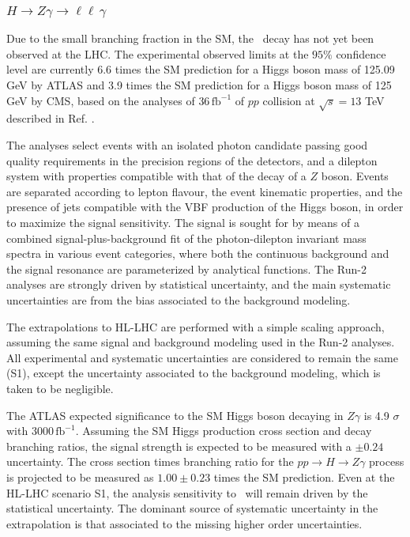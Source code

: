 \subsubsection{$H \to Z\gamma \to \ell\ell\,\gamma$}

Due to the small branching fraction in the SM, the \HZy\ decay has not yet been observed at the LHC. The experimental observed limits at the $95\%$ confidence level are currently 6.6 times the SM prediction for a Higgs boson mass of 125.09 GeV by ATLAS and 3.9 times the SM prediction for a Higgs boson mass of 125 GeV by CMS, based on the analyses of 36\,$\mathrm{fb}^{-1}$ of $pp$ collision at $\sqrt{s} = 13$ TeV described in Ref. \cite{Aaboud:2017uhw, Sirunyan:2018tbk}.

The analyses select events with an isolated photon candidate passing good quality requirements in the precision regions of the detectors, and a dilepton system with properties compatible with that of the decay of a $Z$ boson. Events are separated according to lepton flavour, the event kinematic properties, and the presence of jets compatible with the VBF production of the Higgs boson, in order to maximize the signal sensitivity. The signal is sought for by means of a combined signal-plus-background fit of the photon-dilepton invariant mass spectra in various event categories, where both the continuous background and the signal resonance are parameterized by analytical functions. The Run-2 analyses are strongly driven by statistical uncertainty, and the main systematic uncertainties are from the bias associated to the background modeling.

The extrapolations to HL-LHC are performed with a simple scaling approach, assuming the same signal and background modeling used in the Run-2 analyses. All experimental and systematic uncertainties are considered to remain the same (S1), except the uncertainty associated to the background modeling, which is taken to be negligible.

The ATLAS expected significance to the SM Higgs boson decaying in $Z\gamma$ is 4.9 $\sigma$ with 3000\,$\mathrm{fb}^{-1}$. Assuming the SM Higgs production cross section and decay branching ratios, the signal strength is expected to be measured with a $\pm0.24$ uncertainty. The cross section times branching ratio for the $pp\rightarrow H \rightarrow Z\gamma$ process is projected to be measured as $1.00\pm0.23$ times the SM prediction. Even at the HL-LHC scenario S1, the analysis sensitivity  to \HZy\ will remain driven by the statistical uncertainty. The dominant source of systematic uncertainty in the extrapolation is that associated to the 
missing higher order uncertainties.

